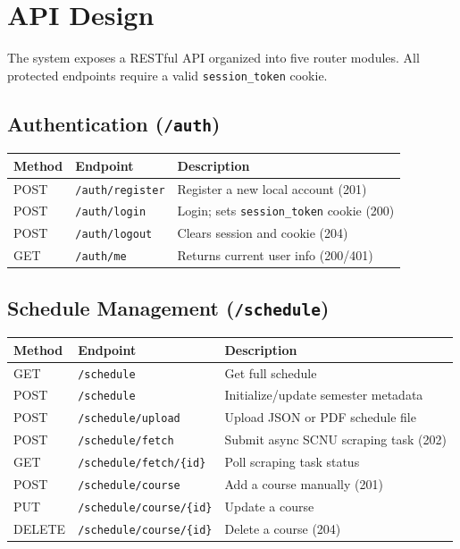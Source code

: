 \documentclass[12pt,a4paper]{article}
\begin{document}
\section{API Design}
\label{sec:api}

The system exposes a RESTful API organized into five router modules. All protected endpoints require a valid \texttt{session\_token} cookie.

\subsection{Authentication (\texttt{/auth})}

\begin{longtable}{@{}llp{7cm}@{}}
\toprule
\textbf{Method} & \textbf{Endpoint} & \textbf{Description} \\
\midrule
\endhead
POST & \texttt{/auth/register} & Register a new local account (201) \\
POST & \texttt{/auth/login} & Login; sets \texttt{session\_token} cookie (200) \\
POST & \texttt{/auth/logout} & Clears session and cookie (204) \\
GET & \texttt{/auth/me} & Returns current user info (200/401) \\
\bottomrule
\end{longtable}

\subsection{Schedule Management (\texttt{/schedule})}

\begin{longtable}{@{}llp{7cm}@{}}
\toprule
\textbf{Method} & \textbf{Endpoint} & \textbf{Description} \\
\midrule
\endhead
GET & \texttt{/schedule} & Get full schedule \\
POST & \texttt{/schedule} & Initialize/update semester metadata \\
POST & \texttt{/schedule/upload} & Upload JSON or PDF schedule file \\
POST & \texttt{/schedule/fetch} & Submit async SCNU scraping task (202) \\
GET & \texttt{/schedule/fetch/\{id\}} & Poll scraping task status \\
POST & \texttt{/schedule/course} & Add a course manually (201) \\
PUT & \texttt{/schedule/course/\{id\}} & Update a course \\
DELETE & \texttt{/schedule/course/\{id\}} & Delete a course (204) \\
\bottomrule
\end{longtable}
\end{document}
